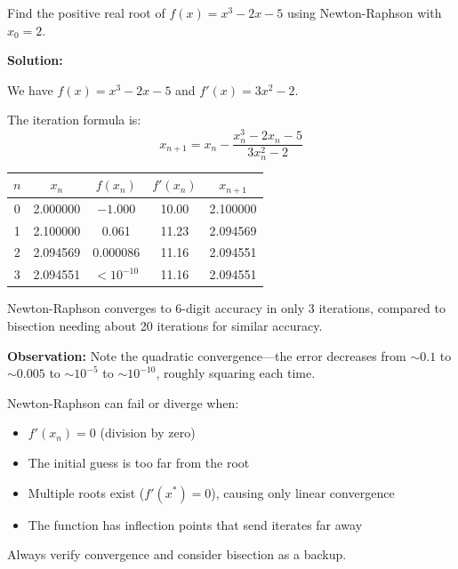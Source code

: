 \begin{examplebox}[title=Example 11.2: Newton-Raphson for the Same Problem]
Find the positive real root of $f(x) = x^3 - 2x - 5$ using Newton-Raphson with $x_0 = 2$.

\textbf{Solution:}

We have $f(x) = x^3 - 2x - 5$ and $f'(x) = 3x^2 - 2$.

The iteration formula is:
\begin{equation*}
x_{n+1} = x_n - \frac{x_n^3 - 2x_n - 5}{3x_n^2 - 2}
\end{equation*}

\begin{center}
\begin{tabular}{ccccc}
\toprule
$n$ & $x_n$ & $f(x_n)$ & $f'(x_n)$ & $x_{n+1}$ \\
\midrule
0 & 2.000000 & $-1.000$ & 10.00 & 2.100000 \\
1 & 2.100000 & 0.061 & 11.23 & 2.094569 \\
2 & 2.094569 & 0.000086 & 11.16 & 2.094551 \\
3 & 2.094551 & $< 10^{-10}$ & 11.16 & 2.094551 \\
\bottomrule
\end{tabular}
\end{center}

Newton-Raphson converges to 6-digit accuracy in only 3 iterations, compared to bisection needing about 20 iterations for similar accuracy.

\textbf{Observation:} Note the quadratic convergence---the error decreases from $\sim 0.1$ to $\sim 0.005$ to $\sim 10^{-5}$ to $\sim 10^{-10}$, roughly squaring each time.
\end{examplebox}

\begin{warningbox}[title=Newton-Raphson Failure Modes]
Newton-Raphson can fail or diverge when:
\begin{itemize}
    \item $f'(x_n) = 0$ (division by zero)
    \item The initial guess is too far from the root
    \item Multiple roots exist ($f'(x^*) = 0$), causing only linear convergence
    \item The function has inflection points that send iterates far away
\end{itemize}
Always verify convergence and consider bisection as a backup.
\end{warningbox}

